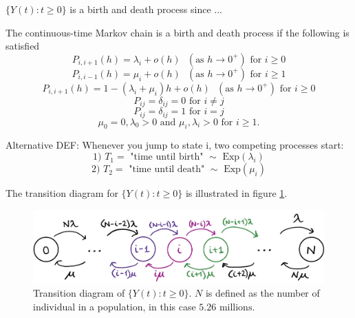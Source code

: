 $\{Y(t):t \geq 0\}$ is a birth and death process since ... 


The continuous-time Markov chain is a birth and death process if the following is satisfied
$$P_{i, i+1}(h) = \lambda_i + o(h) \text{ }(\text{as } h\rightarrow 0^+) \text{ for } i \geq 0$$
$$P_{i, i-1}(h) = \mu_i + o(h) \text{ }(\text{as } h\rightarrow 0^+) \text{ for } i \geq 1$$
$$P_{i, i+1}(h) = 1 - (\lambda_i + \mu_i)h+ o(h) \text{ }(\text{as } h\rightarrow 0^+) \text{ for } i \geq 0$$
$$ P_{ij} = \delta_{ij} = 0 \text{ for } i \neq j $$
$$ P_{ij} = \delta_{ij} = 1 \text{ for } i = j $$
$$\mu_0 = 0, \lambda_0 > 0\text{ and } \mu_i, \lambda_i > 0 \text{ for } i\geq1.$$

Alternative DEF:
Whenever you jump to state i, two competing processes start: 
$$\text{1) } T_1  = \text{ "time until birth" } \sim \text{ Exp}(\lambda_i)$$
$$\text{2) } T_2 = \text{ "time until death" } \sim \text{ Exp}(\mu_i)$$

The transition diagram for $\{Y(t): t\geq 0\}$ is illustrated in figure \ref{transdiagramY}.

\begin{figure}
    \centering
    \includegraphics[width=140mm]{TransDiag1F.png}
    \caption{Transition diagram of $\{Y(t):t \geq 0 \}$. $N$ is defined as the number of individual in a population, in this case $5.26 \text{ millions.}$}
    \label{transdiagramY}
\end{figure}